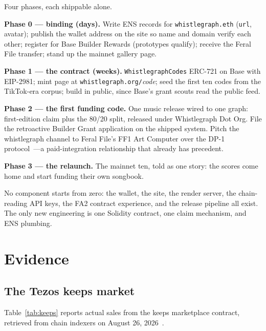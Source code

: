 \documentclass[10pt,letterpaper,twocolumn]{article}
\newcommand{\code}[1]{\texttt{#1}}
\begin{document}
Four phases, each shippable alone.

\textbf{Phase 0 --- binding (days).} Write ENS records for \code{whistlegraph.eth} (\code{url}, avatar); publish the wallet address on the site so name and domain verify each other; register for Base Builder Rewards (prototypes qualify); receive the Feral File transfer; stand up the mainnet gallery page.

\textbf{Phase 1 --- the contract (weeks).} \code{WhistlegraphCodes} ERC-721 on Base with EIP-2981; mint page at \code{whistlegraph.org/}\textit{code}; seed the first ten codes from the TikTok-era corpus; build in public, since Base's grant scouts read the public feed.

\textbf{Phase 2 --- the first funding code.} One music release wired to one graph: first-edition claim plus the 80/20 split, released under Whistlegraph Dot Org. File the retroactive Builder Grant application on the shipped system. Pitch the whistlegraph channel to Feral File's FF1 Art Computer over the DP-1 protocol~\citep{dp1feed2025}---a paid-integration relationship that already has precedent.

\textbf{Phase 3 --- the relaunch.} The mainnet ten, told as one story: the scores come home and start funding their own songbook.

No component starts from zero: the wallet, the site, the render server, the chain-reading API keys, the FA2 contract experience, and the release pipeline all exist. The only new engineering is one Solidity contract, one claim mechanism, and ENS plumbing.

\section{Evidence}
\label{sec:evidence}

\subsection{The Tezos keeps market}

Table~\ref{tab:keeps} reports actual sales from the keeps marketplace contract, retrieved from chain indexers on August 26, 2026~\citep{tzkt2026keeps}.
\end{document}
